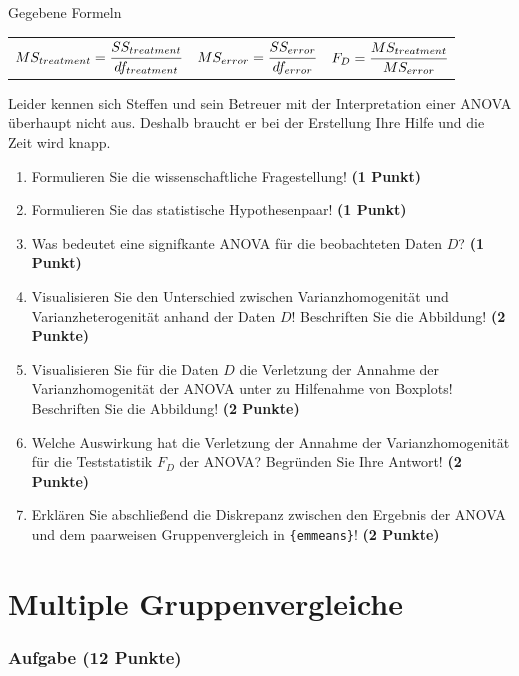 \documentclass[a4paper, 9pt]{scrartcl}\usepackage[]{graphicx}\usepackage[]{xcolor}
\begin{document}
\begin{graybox}{Gegebene Formeln}
\begin{center}
  \begin{tabular}{ccc}
    $MS_{treatment} = \cfrac{SS_{treatment}}{df_{treatment}}$ &
    $MS_{error} = \cfrac{SS_{error}}{df_{error}}$ &
    $F_{D} = \cfrac{MS_{treatment}}{MS_{error}}$ \\
  \end{tabular}
\end{center}
\end{graybox}

Leider kennen sich Steffen und sein Betreuer mit der Interpretation einer ANOVA überhaupt nicht aus. Deshalb braucht er bei der Erstellung Ihre Hilfe und die Zeit wird knapp. 

\begin{enumerate}
  \item Formulieren Sie die wissenschaftliche Fragestellung! \textbf{(1 Punkt)}
  \item Formulieren Sie das statistische Hypothesenpaar! \textbf{(1 Punkt)}
\item Was bedeutet eine signifkante ANOVA für die beobachteten Daten $D$? \textbf{(1 Punkt)}
\item Visualisieren Sie den Unterschied zwischen Varianzhomogenität und Varianzheterogenität anhand der Daten $D$! Beschriften Sie die Abbildung! \textbf{(2 Punkte)} 
\item Visualisieren Sie für die Daten $D$ die Verletzung der Annahme der Varianzhomogenität der ANOVA unter zu Hilfenahme von Boxplots! Beschriften Sie die Abbildung! \textbf{(2 Punkte)}
\item Welche Auswirkung hat die Verletzung der Annahme der Varianzhomogenität für die Teststatistik $F_D$ der ANOVA? Begründen Sie Ihre Antwort! \textbf{(2 Punkte)}
\item Erklären Sie abschließend die Diskrepanz zwischen den Ergebnis der ANOVA und dem paarweisen Gruppenvergleich in \texttt{\{emmeans\}}! \textbf{(2 Punkte)}
\end{enumerate}

 
\clearpage
\part{Multiple Gruppenvergleiche}

\section{Aufgabe \hfill (12 Punkte)}
\end{document}
